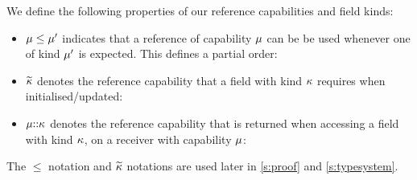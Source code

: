 We define the following properties of our reference capabilities and field kinds:
\begin{itemize}
	\item $\mu \leq \mu'$ indicates that a reference of capability $\mu$ can be be used whenever one of kind $\mu'$ is expected. This defines a partial order:\\
	\SS[1]
	
	\item $\widetilde{\kappa}$ denotes the reference capability that a field with kind $\kappa$ requires when initialised/updated:\\
	\SS[1]
	
	\item $\mu{::}\kappa$ denotes the reference capability that is returned when accessing a field with kind $\kappa$, on a receiver with capability $\mu$:\\
	\SS[1]
\end{itemize}

The $\leq$ notation and $\widetilde{\kappa}$ notations are used later in \ref{s:proof} and \ref{s:typesystem}.

